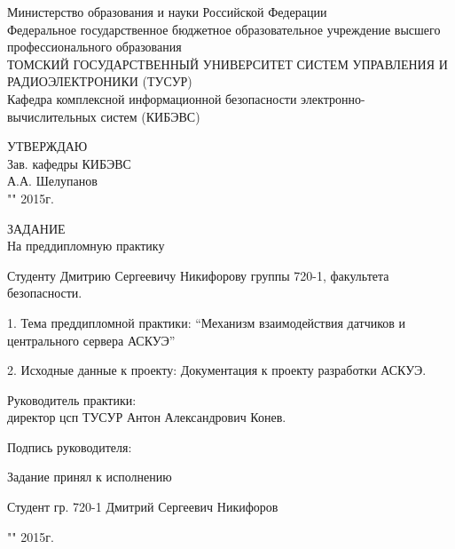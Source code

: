 \newpage
{}

\begin{center}
Министерство образования и науки Российской Федерации\\
Федеральное государственное бюджетное образовательное учреждение высшего профессионального образования\\
ТОМСКИЙ ГОСУДАРСТВЕННЫЙ УНИВЕРСИТЕТ СИСТЕМ УПРАВЛЕНИЯ И РАДИОЭЛЕКТРОНИКИ (ТУСУР)\\
Кафедра комплексной информационной безопасности электронно-вычислительных систем (КИБЭВС)\\
\end{center}

\begin{flushright}
 \begin{minipage}{0.4\textwidth}
  УТВЕРЖДАЮ \\
  Зав. кафедры КИБЭВС \\
  \underline{\hspace{2.5cm}}А.А. Шелупанов \\
  "\underline{\hspace{1cm}}"\underline{\hspace{3cm}} 2015г.
 \end{minipage}
\end{flushright}

\vspace{2cm}

\begin{center}
 ЗАДАНИЕ \\
 На преддипломную практику
\end{center}

Студенту Дмитрию Сергеевичу Никифорову группы 720-1, факультета безопасности.

1. Тема преддипломной практики: ``Механизм взаимодействия датчиков и центрального сервера АСКУЭ''

2. Исходные данные к проекту: Документация к проекту разработки АСКУЭ.

Руководитель практики: \\ директор цсп ТУСУР Антон Александрович Конев.

\hfill Подпись руководителя: \underline{\hspace{2.5cm}}

Задание принял к исполнению

Студент гр. 720-1 Дмитрий Сергеевич Никифоров \hfill \underline{\hspace{2.5cm}}

\hfill "\underline{\hspace{1cm}}"\underline{\hspace{3cm}} 2015г.